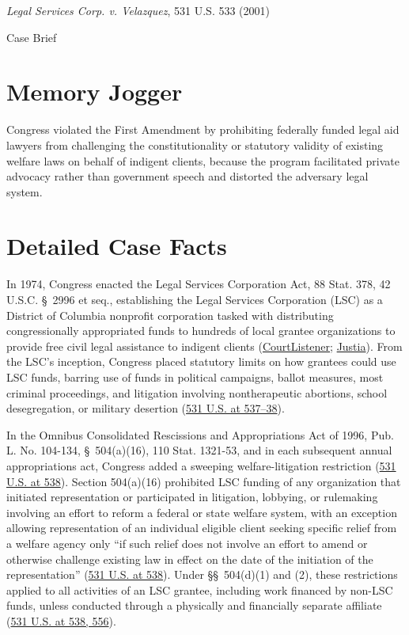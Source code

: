 \documentclass[12pt]{article}
\begin{document}
\begin{center}
{\LARGE \textit{Legal Services Corp. v. Velazquez}, 531 U.S. 533 (2001)\par}
\vspace{0.8em}
{\large Case Brief\par}
\end{center}
\vspace{1em}

\section{Memory Jogger}
Congress violated the First Amendment by prohibiting federally funded legal aid lawyers from challenging the constitutionality or statutory validity of existing welfare laws on behalf of indigent clients, because the program facilitated private advocacy rather than government speech and distorted the adversary legal system.

\section{Detailed Case Facts}
In 1974, Congress enacted the Legal Services Corporation Act, 88 Stat. 378, 42 U.S.C. \S~2996 et seq., establishing the Legal Services Corporation (LSC) as a District of Columbia nonprofit corporation tasked with distributing congressionally appropriated funds to hundreds of local grantee organizations to provide free civil legal assistance to indigent clients (\href{https://www.courtlistener.com/opinion/2621077/legal-services-corp-v-velazquez/}{CourtListener}; \href{https://supreme.justia.com/cases/federal/us/531/533/}{Justia}). From the LSC's inception, Congress placed statutory limits on how grantees could use LSC funds, barring use of funds in political campaigns, ballot measures, most criminal proceedings, and litigation involving nontherapeutic abortions, school desegregation, or military desertion (\href{https://supreme.justia.com/cases/federal/us/531/533/}{531 U.S. at 537--38}).

In the Omnibus Consolidated Rescissions and Appropriations Act of 1996, Pub. L. No. 104-134, \S~504(a)(16), 110 Stat. 1321-53, and in each subsequent annual appropriations act, Congress added a sweeping welfare-litigation restriction (\href{https://supreme.justia.com/cases/federal/us/531/533/}{531 U.S. at 538}). Section 504(a)(16) prohibited LSC funding of any organization that initiated representation or participated in litigation, lobbying, or rulemaking involving an effort to reform a federal or state welfare system, with an exception allowing representation of an individual eligible client seeking specific relief from a welfare agency only ``if such relief does not involve an effort to amend or otherwise challenge existing law in effect on the date of the initiation of the representation'' (\href{https://supreme.justia.com/cases/federal/us/531/533/}{531 U.S. at 538}). Under \S\S~504(d)(1) and (2), these restrictions applied to all activities of an LSC grantee, including work financed by non-LSC funds, unless conducted through a physically and financially separate affiliate (\href{https://supreme.justia.com/cases/federal/us/531/533/}{531 U.S. at 538, 556}).
\end{document}
